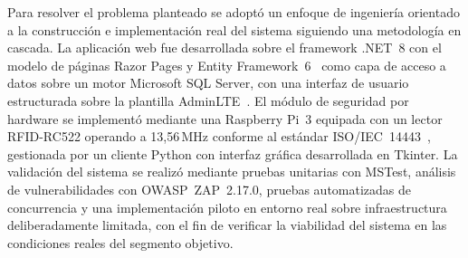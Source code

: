 Para resolver el problema planteado se adoptó un enfoque de ingeniería orientado a la 
construcción e implementación real del sistema siguiendo una metodología en cascada. La 
aplicación web fue desarrollada sobre el framework .NET~8 con el modelo de páginas Razor 
Pages y Entity Framework~6~\cite{ef6_docs} como capa de acceso a datos sobre un motor 
Microsoft SQL Server, con una interfaz de usuario estructurada sobre la plantilla 
AdminLTE~\cite{BALSAM2025112186}. El módulo de seguridad por hardware se implementó 
mediante una Raspberry Pi~3 equipada con un lector RFID-RC522 operando a 13,56\,MHz 
conforme al estándar ISO/IEC~14443~\cite{Liyanage2018}, gestionada por un cliente Python 
con interfaz gráfica desarrollada en Tkinter. La validación del sistema se realizó mediante 
pruebas unitarias con MSTest, análisis de vulnerabilidades con OWASP~ZAP~2.17.0, pruebas 
automatizadas de concurrencia y una implementación piloto en entorno real sobre 
infraestructura deliberadamente limitada, con el fin de verificar la viabilidad del sistema 
en las condiciones reales del segmento objetivo.
